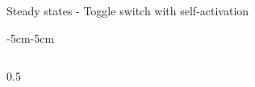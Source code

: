 \documentclass[aspectratio=169,9pt]{beamer}
\theoremstyle{definition}
\theoremstyle{remark}
\begin{document}
\begin{frame}{Steady states - Toggle switch with self-activation}
\begin{adjustwidth}{-5cm}{-5cm}
\begin{columns}
    \begin{column}{0.5\textwidth}
\end{column}
\end{columns}
\end{adjustwidth}
\end{frame}
\end{document}
